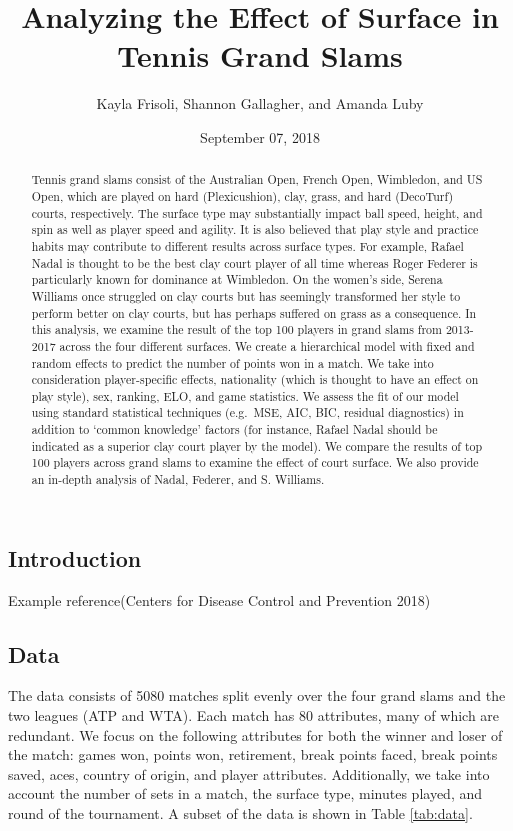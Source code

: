 \documentclass[]{article}
\title{Analyzing the Effect of Surface in Tennis Grand Slams}
\author{Kayla Frisoli, Shannon Gallagher, and Amanda Luby}
\date{September 07, 2018}
\begin{document}
\maketitle
\begin{abstract}
Tennis grand slams consist of the Australian Open, French Open,
Wimbledon, and US Open, which are played on hard (Plexicushion), clay,
grass, and hard (DecoTurf) courts, respectively. The surface type may
substantially impact ball speed, height, and spin as well as player
speed and agility. It is also believed that play style and practice
habits may contribute to different results across surface types. For
example, Rafael Nadal is thought to be the best clay court player of all
time whereas Roger Federer is particularly known for dominance at
Wimbledon. On the women's side, Serena Williams once struggled on clay
courts but has seemingly transformed her style to perform better on clay
courts, but has perhaps suffered on grass as a consequence. In this
analysis, we examine the result of the top 100 players in grand slams
from 2013-2017 across the four different surfaces. We create a
hierarchical model with fixed and random effects to predict the number
of points won in a match. We take into consideration player-specific
effects, nationality (which is thought to have an effect on play style),
sex, ranking, ELO, and game statistics. We assess the fit of our model
using standard statistical techniques (e.g.~MSE, AIC, BIC, residual
diagnostics) in addition to `common knowledge' factors (for instance,
Rafael Nadal should be indicated as a superior clay court player by the
model). We compare the results of top 100 players across grand slams to
examine the effect of court surface. We also provide an in-depth
analysis of Nadal, Federer, and S. Williams.
\end{abstract}

\hypertarget{introduction}{%
\subsection{Introduction}\label{introduction}}

Example reference(Centers for Disease Control and Prevention 2018)

\hypertarget{data}{%
\subsection{Data}\label{data}}

The data consists of 5080 matches split evenly over the four grand slams
and the two leagues (ATP and WTA). Each match has 80 attributes, many of
which are redundant. We focus on the following attributes for both the
winner and loser of the match: games won, points won, retirement, break
points faced, break points saved, aces, country of origin, and player
attributes. Additionally, we take into account the number of sets in a
match, the surface type, minutes played, and round of the tournament. A
subset of the data is shown in Table \ref{tab:data}.
\end{document}
